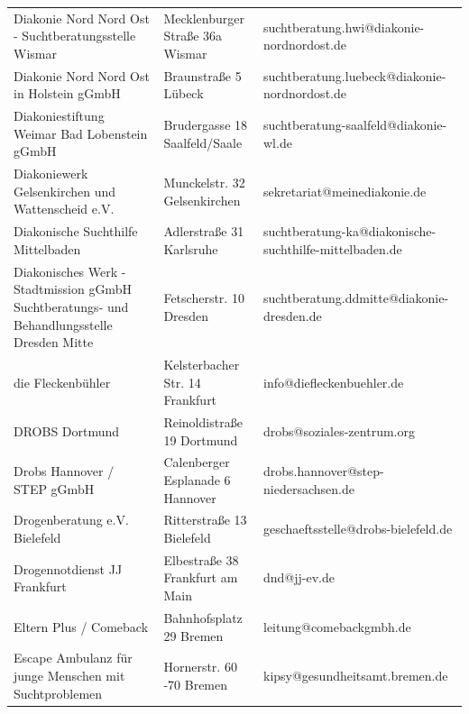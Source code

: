 {\begin{xltabular}{\textwidth} {
 >{\raggedright\arraybackslash}p{5cm}
 >{\raggedright\arraybackslash}X
 >{\raggedright\arraybackslash}p{5cm} }
Diakonie Nord Nord Ost - Suchtberatungsstelle Wismar & Mecklenburger Straße 36a Wismar & suchtberatung.hwi@diakonie-nordnordost.de \\
Diakonie Nord Nord Ost in Holstein gGmbH & Braunstraße 5 Lübeck & suchtberatung.luebeck@diakonie-nordnordost.de \\
Diakoniestiftung Weimar Bad Lobenstein gGmbH & Brudergasse 18 Saalfeld/Saale & suchtberatung-saalfeld@diakonie-wl.de \\
Diakoniewerk Gelsenkirchen und Wattenscheid e.V. & Munckelstr. 32 Gelsenkirchen & sekretariat@meinediakonie.de \\
Diakonische Suchthilfe Mittelbaden & Adlerstraße 31 Karlsruhe & suchtberatung-ka@diakonische-suchthilfe-mittelbaden.de \\
Diakonisches Werk - Stadtmission gGmbH Suchtberatungs- und Behandlungsstelle Dresden Mitte & Fetscherstr. 10 Dresden & suchtberatung.ddmitte@diakonie-dresden.de \\
die Fleckenbühler & Kelsterbacher Str. 14 Frankfurt & info@diefleckenbuehler.de \\
DROBS Dortmund & Reinoldistraße 19 Dortmund & drobs@soziales-zentrum.org \\
Drobs Hannover / STEP gGmbH & Calenberger Esplanade 6 Hannover & drobs.hannover@step-niedersachsen.de \\
Drogenberatung e.V. Bielefeld & Ritterstraße 13 Bielefeld & geschaeftsstelle@drobs-bielefeld.de \\
Drogennotdienst JJ Frankfurt & Elbestraße 38 Frankfurt am Main & dnd@jj-ev.de \\
Eltern Plus / Comeback & Bahnhofsplatz 29 Bremen & leitung@comebackgmbh.de \\
Escape Ambulanz für junge Menschen mit Suchtproblemen & Hornerstr. 60 -70 Bremen & kipsy@gesundheitsamt.bremen.de \\

\end{xltabular}}
